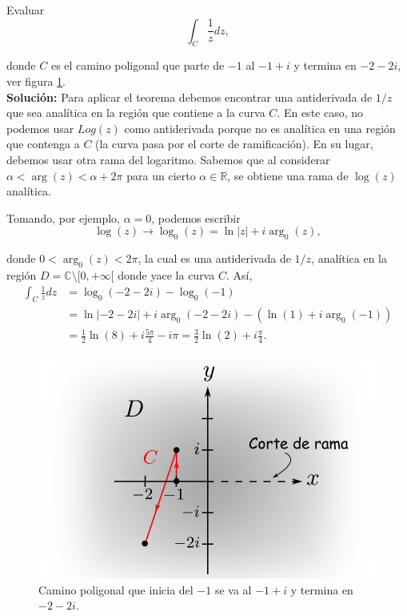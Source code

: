 \begin{ejemplo}
Evaluar 
$$\int_C \frac{1}{z} dz,$$

donde $C$ es el camino poligonal que parte de $-1$ al $-1+i$ y termina en $-2-2i$, ver figura \ref{fig:EjTFC2}.
\\

\textbf{Solución:} Para aplicar el teorema debemos encontrar una antiderivada de $1/z$ que sea analítica en la región que contiene a la curva $C$. En este caso, no podemos usar $Log(z)$ como antiderivada porque no es analítica en una región que contenga a $C$ (la curva pasa por el corte de ramificación). En su lugar, debemos usar otra rama del logaritmo. Sabemos que al considerar $\alpha < \arg(z) < \alpha + 2\pi$ para un cierto $\alpha \in \mathbb{R}$, se obtiene una rama de $\log(z)$ analítica. 

Tomando, por ejemplo, $\alpha = 0$, podemos escribir 
$$\log(z) \rightarrow \log_0(z) = \ln|z| + i \arg_0(z),$$

donde $0 < \arg_0(z) < 2\pi$, la cual es una antiderivada de $1/z$, analítica en la región $D = \mathbb{C}\setminus [0, +\infty[$ donde yace la curva $C$. Así,
\begin{align*}
    \int_C \frac{1}{z} dz &= \log_0(-2-2i) - \log_0(-1) \\
    &= \ln|-2-2i| + i \arg_0(-2-2i) - (\ln(1) + i \arg_0(-1)) \\
    &= \frac{1}{2} \ln(8) + i \frac{5\pi}{4} - i \pi = \frac{3}{2} \ln(2) + i\frac{\pi}{4}.
\end{align*}

\begin{figure}[H]
        \centering
        \includegraphics[scale = 0.5]{Figuras/Ejemplo_TFCIntegralLinea2.pdf}
        \caption{Camino poligonal que inicia del $-1$ se va al $-1+i$ y termina en $-2-2i$.}
        \label{fig:EjTFC2}
    \end{figure}
\end{ejemplo}

